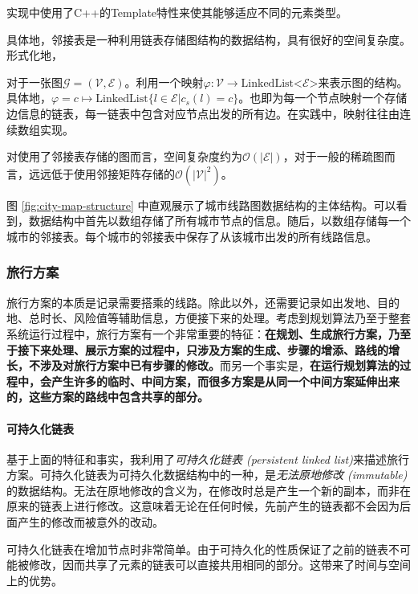 实现中使用了C++的Template特性来使其能够适应不同的元素类型。

具体地，邻接表是一种利用链表存储图结构的数据结构，具有很好的空间复杂度。形式化地，
\begin{definition}[邻接表]
  对于一张图$\mathcal G = (\mathcal V, \mathcal E)$。利用一个映射$\varphi : \mathcal V \rightarrow \text{LinkedList<} \mathcal E \text{>}$来表示图的结构。具体地，$\varphi = c \mapsto \text{LinkedList} \{ l \in \mathcal E | c_s(l) = c \} $。也即为每一个节点映射一个存储边信息的链表，每一链表中包含对应节点出发的所有边。在实践中，映射往往由连续数组实现。
\end{definition}

对使用了邻接表存储的图而言，空间复杂度约为$\mathcal O(| \mathcal E |)$，对于一般的稀疏图而言，远远低于使用邻接矩阵存储的$\mathcal O(| \mathcal V |^2)$。

图 \ref{fig:city-map-structure} 中直观展示了城市线路图数据结构的主体结构。可以看到，数据结构中首先以数组存储了所有城市节点的信息。随后，以数组存储每一个城市的邻接表。每个城市的邻接表中保存了从该城市出发的所有线路信息。

\subsubsection{旅行方案}

旅行方案的本质是记录需要搭乘的线路。除此以外，还需要记录如出发地、目的地、总时长、风险值等辅助信息，方便接下来的处理。考虑到规划算法乃至于整套系统运行过程中，旅行方案有一个非常重要的特征：\textbf{在规划、生成旅行方案，乃至于接下来处理、展示方案的过程中，只涉及方案的生成、步骤的增添、路线的增长，不涉及对旅行方案中已有步骤的修改。}而另一个事实是，\textbf{在运行规划算法的过程中，会产生许多的临时、中间方案，而很多方案是从同一个中间方案延伸出来的，这些方案的路线中包含共享的部分。}

\paragraph{可持久化链表} 基于上面的特征和事实，我利用了\emph{可持久化链表 (persistent linked list)}来描述旅行方案。可持久化链表为可持久化数据结构中的一种，是\emph{无法原地修改 (immutable)}的数据结构。无法在原地修改的含义为，在修改时总是产生一个新的副本，而非在原来的链表上进行修改。这意味着无论在任何时候，先前产生的链表都不会因为后面产生的修改而被意外的改动。

可持久化链表在增加节点时非常简单。由于可持久化的性质保证了之前的链表不可能被修改，因而共享了元素的链表可以直接共用相同的部分。这带来了时间与空间上的优势。

